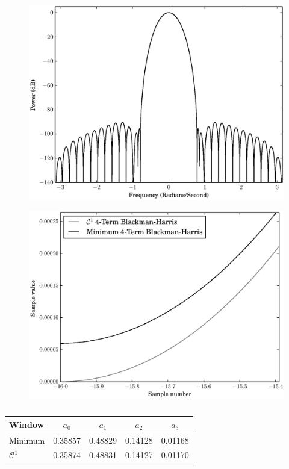 \begin{figure}[!t]
    \caption{}
    \centering
    \includegraphics[width=\figwidthscale\textwidth]{plots/c1_blackman_fd.eps}
    \CaptionWithTitle{%
    }{}
\end{figure}

\begin{figure}[!t]
    \caption{\label{plot:c1vsminblackmancloseup}}
    \centering
    \includegraphics[width=\figwidthscale\textwidth]{plots/c1_vs_min_blackman_closeup.eps}
    \CaptionWithTitle{%
    }{}
\end{figure}

\begin{table}
    \caption{\label{tab:optblackman}}
    \begin{center}
        \begin{tabular}{l c c c c }
            Window & $a_0$ & $a_1$ & $a_2$ & $a_3$ \\
            \hline
            Minimum & 0.35857 & 0.48829 & 0.14128 &
            0.01168 \\
            $\mathcal{C}^{1}$ & 0.35874 & 0.48831 &
            0.14127 & 0.01170
        \end{tabular}
    \end{center}
\end{table}

